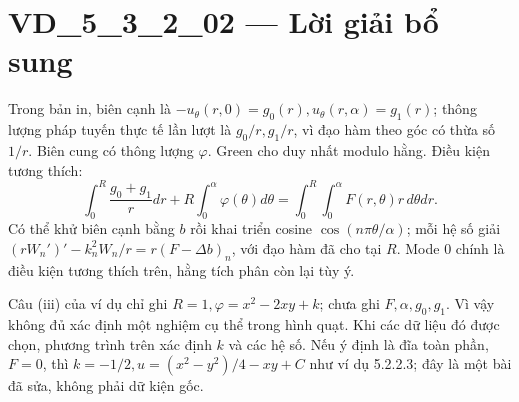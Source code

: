 \documentclass[10pt,a4paper]{article}
\begin{document}
\section*{VD\_5\_3\_2\_02 — Lời giải bổ sung}
Trong bản in, biên cạnh là $-u_\theta(r,0)=g_0(r),u_\theta(r,\alpha)=g_1(r)$; thông lượng pháp tuyến thực tế lần lượt là $g_0/r,g_1/r$, vì đạo hàm theo góc có thừa số $1/r$. Biên cung có thông lượng $\varphi$. Green cho duy nhất modulo hằng. Điều kiện tương thích:
\[\int_0^R\frac{g_0+g_1}{r}dr+R\int_0^\alpha\varphi(\theta)d\theta=\int_0^R\int_0^\alpha F(r,\theta)r\,d\theta dr.\]
Có thể khử biên cạnh bằng $b$ rồi khai triển cosine $\cos(n\pi\theta/\alpha)$; mỗi hệ số giải $(rW_n')'-k_n^2W_n/r=r(F-\Delta b)_n$, với đạo hàm đã cho tại $R$. Mode 0 chính là điều kiện tương thích trên, hằng tích phân còn lại tùy ý.

Câu (iii) của ví dụ chỉ ghi $R=1,\varphi=x^2-2xy+k$; chưa ghi $F,\alpha,g_0,g_1$. Vì vậy không đủ xác định một nghiệm cụ thể trong hình quạt. Khi các dữ liệu đó được chọn, phương trình trên xác định $k$ và các hệ số. Nếu ý định là đĩa toàn phần, $F=0$, thì $k=-1/2,u=(x^2-y^2)/4-xy+C$ như ví dụ 5.2.2.3; đây là một bài đã sửa, không phải dữ kiện gốc.
\end{document}
